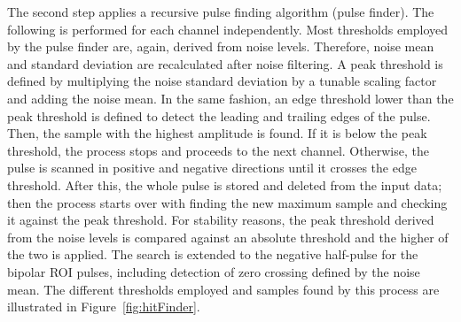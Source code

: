 \documentclass[instruments,article,submit,moreauthors,pdftex]{Definitions/mdpi}
\begin{document}
The second step applies a recursive pulse finding algorithm (pulse finder).
The following is performed for each channel independently.
Most thresholds employed by the pulse finder are, again, derived from noise levels.
Therefore, noise mean and standard deviation are recalculated after noise filtering.
A peak threshold is defined by multiplying the noise standard deviation by a tunable scaling factor and adding the noise mean.
In the same fashion, an edge threshold lower than the peak threshold is defined to detect the leading and trailing edges of the pulse.
Then, the sample with the highest amplitude is found.
If it is below the peak threshold, the process stops and proceeds to the next channel.
Otherwise, the pulse is scanned in positive and negative directions until it crosses the edge threshold.
After this, the whole pulse is stored and deleted from the input data; then the process starts over with finding the new maximum sample and checking it against the peak threshold.
For stability reasons, the peak threshold derived from the noise levels is compared against an absolute threshold and the higher of the two is applied.
The search is extended to the negative half-pulse for the bipolar ROI pulses, including detection of zero crossing defined by the noise mean.
The different thresholds employed and samples found by this process are illustrated in Figure~\ref{fig:hitFinder}.
\end{document}
